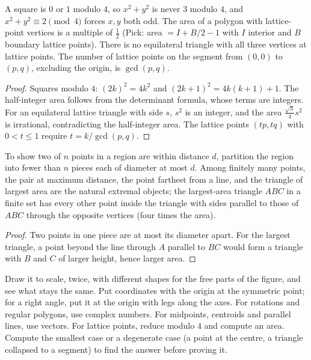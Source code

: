 \begin{proposition}
A square is $0$ or $1$ modulo $4$, so $x^2+y^2$ is never $3$ modulo $4$, and $x^2+y^2\equiv 2\pmod4$ forces $x,y$ both odd. The area of a polygon with lattice-point vertices is a multiple of $\tfrac12$ (Pick: area $=I+B/2-1$ with $I$ interior and $B$ boundary lattice points). There is no equilateral triangle with all three vertices at lattice points. The number of lattice points on the segment from $(0,0)$ to $(p,q)$, excluding the origin, is $\gcd(p,q)$.
\end{proposition}

\begin{proof}
Squares modulo $4$: $(2k)^2=4k^2$ and $(2k+1)^2=4k(k+1)+1$. The half-integer area follows from the determinant formula, whose terms are integers. For an equilateral lattice triangle with side $s$, $s^2$ is an integer, and the area $\tfrac{\sqrt3}4s^2$ is irrational, contradicting the half-integer area. The lattice points $(tp,tq)$ with $0<t\le1$ require $t=k/\gcd(p,q)$.
\end{proof}

\begin{proposition}
To show two of $n$ points in a region are within distance $d$, partition the region into fewer than $n$ pieces each of diameter at most $d$. Among finitely many points, the pair at maximum distance, the point farthest from a line, and the triangle of largest area are the natural extremal objects; the largest-area triangle $ABC$ in a finite set has every other point inside the triangle with sides parallel to those of $ABC$ through the opposite vertices (four times the area).
\end{proposition}

\begin{proof}
Two points in one piece are at most its diameter apart. For the largest triangle, a point beyond the line through $A$ parallel to $BC$ would form a triangle with $B$ and $C$ of larger height, hence larger area.
\end{proof}

\begin{firstmoves}
Draw it to scale, twice, with different shapes for the free parts of the figure, and see what stays the same. Put coordinates with the origin at the symmetric point; for a right angle, put it at the origin with legs along the axes. For rotations and regular polygons, use complex numbers. For midpoints, centroids and parallel lines, use vectors. For lattice points, reduce modulo $4$ and compute an area. Compute the smallest case or a degenerate case (a point at the centre, a triangle collapsed to a segment) to find the answer before proving it.
\end{firstmoves}

